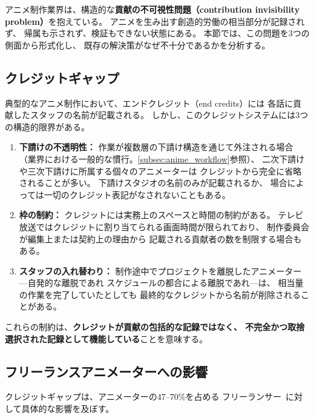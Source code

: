 
アニメ制作業界は、構造的な\textbf{貢献の不可視性問題（contribution invisibility problem）}を抱えている。
アニメを生み出す創造的労働の相当部分が記録されず、
帰属も示されず、検証もできない状態にある。
本節では、この問題を3つの側面から形式化し、
既存の解決策がなぜ不十分であるかを分析する。

\subsection{クレジットギャップ}
\label{subsec:credit_gap}

典型的なアニメ制作において、エンドクレジット（end credits）には
各話に貢献したスタッフの名前が記載される。
しかし、このクレジットシステムには3つの構造的限界がある。

\begin{enumerate}
  \item \textbf{下請けの不透明性：}
    作業が複数層の下請け構造を通じて外注される場合
    （業界における一般的な慣行。\cref{subsec:anime_workflow}参照）、
    二次下請けや三次下請けに所属する個々のアニメーターは
    クレジットから完全に省略されることが多い。
    下請けスタジオの名前のみが記載されるか、
    場合によっては一切のクレジット表記がなされないこともある。
  \item \textbf{枠の制約：}
    クレジットには実務上のスペースと時間の制約がある。
    テレビ放送ではクレジットに割り当てられる画面時間が限られており、
    制作委員会が編集上または契約上の理由から
    記載される貢献者の数を制限する場合もある。
  \item \textbf{スタッフの入れ替わり：}
    制作途中でプロジェクトを離脱したアニメーター---自発的な離脱であれ
    スケジュールの都合による離脱であれ---は、
    相当量の作業を完了していたとしても
    最終的なクレジットから名前が削除されることがある。
\end{enumerate}

これらの制約は、\textbf{クレジットが貢献の包括的な記録ではなく、
不完全かつ取捨選択された記録として機能している}ことを意味する。

\subsection{フリーランスアニメーターへの影響}
\label{subsec:consequences}

クレジットギャップは、アニメーターの47--70\%を占める
フリーランサー~\cite{janica2023survey}に対して具体的な影響を及ぼす。

